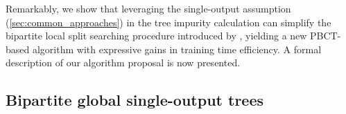 Remarkably, we show that leveraging the single-output assumption (\autoref{sec:common_approaches}) in the tree impurity calculation can simplify the bipartite local split searching procedure introduced by \textcite{pliakos2018global}, yielding a new PBCT-based algorithm with expressive gains in training time efficiency. A formal description of our algorithm proposal is now presented.



%
%

\subsection{Bipartite global single-output trees}
\label{sec:bgso_trees}

